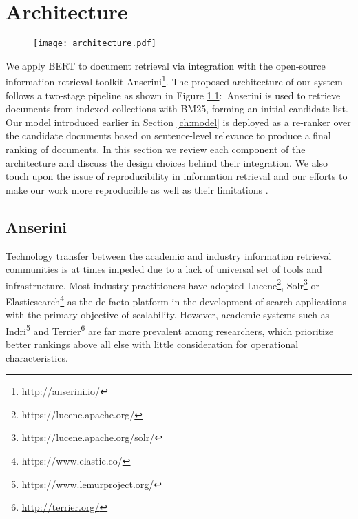 \chapter{Architecture}
\label{ch:arch}

\begin{figure}[b!]
\centering
  \texttt{[image: architecture.pdf]}
\caption{}
\label{fig:arch}
\end{figure}

We apply BERT to document retrieval via integration with the open-source information retrieval toolkit Anserini\footnote{\url{http://anserini.io/}}.
The proposed architecture of our system follows a two-stage pipeline as shown in Figure \ref{fig:arch}:\
Anserini is used to retrieve documents from indexed collections with BM25, forming an initial candidate list.
Our model introduced earlier in Section \ref{ch:model} is deployed as a re-ranker over the candidate documents based on sentence-level relevance to produce a final ranking of documents.
In this section we review each component of the architecture and discuss the design choices behind their integration.
We also touch upon the issue of reproducibility in information retrieval and our efforts to make our work more reproducible as well as their limitations .

\section{Anserini}

Technology transfer between the academic and industry information retrieval communities is at times impeded due to a lack of universal set of tools and infrastructure.
Most industry practitioners have adopted Lucene\footnote{https://lucene.apache.org/}, Solr\footnote{https://lucene.apache.org/solr/} or Elasticsearch\footnote{https://www.elastic.co/} as the de facto platform in the development of search applications with the primary objective of scalability.
However, academic systems such as Indri\footnote{\url{https://www.lemurproject.org/}} and Terrier\footnote{\url{http://terrier.org/}} are far more prevalent among researchers, which prioritize better rankings above all else with little consideration for operational characteristics.

